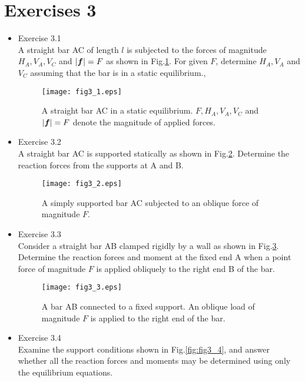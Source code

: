 \documentclass[10pt,a4j]{article}
\begin{document}
\section*{Exercises 3}
\begin{itemize}
\item
Exercise 3.1\\
A straight bar AC of length $l$ is subjected to the forces of magnitude  
$H_A, V_A, V_C$ and $|\mbox{\boldmath $f$}|=F$ as shown in Fig.\ref{fig:fig3_1}. 
For given $F$, determine $H_A, V_A$ and $V_C$ assuming that the bar is in a static equilibrium.,
\begin{figure}[h]
	\begin{center}
	\texttt{[image: fig3\_1.eps]} 
	\end{center}
	\caption{A straight bar AC in a static equilibrium. 
	$F, H_A, V_A, V_C$ and $|\mbox{\boldmath $f$}|=F$ denote the magnitude of applied forces.
	}
	\label{fig:fig3_1}
\end{figure}
\item
Exercise 3.2\\
A straight bar AC is supported statically as shown in Fig.\ref{fig:fig3_2}. 
Determine the reaction forces from the supports at A and B. 
\begin{figure}[h]
	\begin{center}
	\texttt{[image: fig3\_2.eps]} 
	\end{center}
	\caption{A simply supported bar AC subjected to an oblique force of magnitude $F$.}
	\label{fig:fig3_2}
\end{figure}
\item
Exercise 3.3\\
Consider a straight bar AB clamped rigidly by a wall as shown in Fig.\ref{fig:fig3_3}.
Determine the reaction forces and moment at the fixed end A  when 
a point force of magnitude $F$ is applied obliquely to the right end B of the bar.  
\begin{figure}[h]
	\begin{center}
	\texttt{[image: fig3\_3.eps]} 
	\end{center}
	\caption{A bar AB connected to a fixed support. 
	An oblique load of magnitude $F$ is applied to the right end of the bar.} 
	\label{fig:fig3_3}
\end{figure}
\item
Exercise 3.4\\
Examine the support conditions shown in Fig.\ref{fig:fig3_4}, and answer whether 
all the reaction forces and moments may be determined using only the equilibrium equations. 

\end{itemize}
\end{document}
